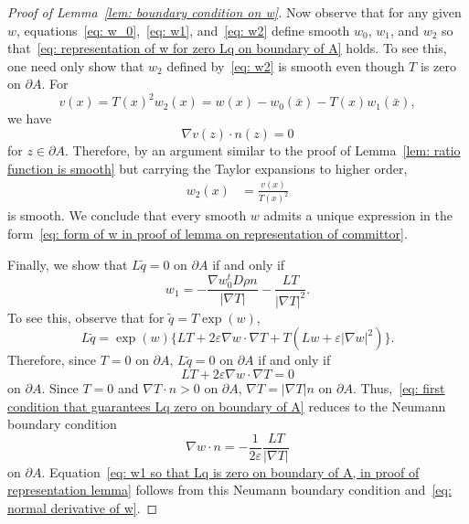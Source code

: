 \documentclass[reqno]{amsart}
\newcommand{\eps}{\varepsilon}
\newcommand{\1}{\mathds{1}}
\newcommand{\grad}{\nabla}
\theoremstyle{definition}
\theoremstyle{remark}
\begin{document}
\begin{proof}[Proof of Lemma~\ref{lem: boundary condition on w}]
  Now observe that for any given $w$, equations~\eqref{eq: w_0},~\eqref{eq: w1}, and~\eqref{eq: w2} define smooth $w_0$, $w_1$, and $w_2$ so that~\eqref{eq: representation of w for zero Lq on boundary of A} holds. To see this, one need only show that $w_2$ defined by~\eqref{eq: w2} is smooth even though $T$ is zero on $\partial A$. For
  \begin{equation*}
    v(x) = T(x)^2 w_2(x) = w(x) - w_0 (\bar x) - T(x) w_1(\bar x),
  \end{equation*}
  we have 
  \begin{equation*}
    \grad v(z) \cdot n(z) = 0
  \end{equation*}
  for $z \in \partial A$. Therefore, by an argument similar to the proof of Lemma~\ref{lem: ratio function is smooth} but carrying the Taylor expansions to higher order, 
  \begin{align*}
    w_2(x) &= \frac{v(x)}{T(x)^2} 
  \end{align*}
  is smooth. We conclude that every smooth $w$ admits a unique expression in the form~\eqref{eq: form of w in proof of lemma on representation of committor}.

  Finally, we show that $L\tilde q = 0$ on $\partial A$ if and only if 
  \begin{equation}\label{eq: w1 so that Lq is zero on boundary of A, in proof of representation lemma}
    w_1 = - \frac{\grad w_0^t D \rho n}{\lvert \grad T \rvert} - \frac{LT}{\lvert \grad T \rvert^2}.
  \end{equation}
  To see this, observe that for $\tilde q = T \exp(w)$, 
  \begin{equation*}
    L \tilde q = \exp(w) \Big \{ L T + 2\eps \grad w \cdot \grad T + T (L w + \eps \lvert \grad w \rvert^2 ) \Big \}.
  \end{equation*}
  Therefore, since $T=0$ on $\partial A$, $L \tilde q =0$ on $\partial A$ if and only if
  \begin{equation}\label{eq: first condition that guarantees Lq zero on boundary of A} 
    L T + 2\eps \grad w \cdot \grad T = 0 
  \end{equation}
  on $\partial A$. Since $T =0$ and $\grad T \cdot n >0$ on $\partial A$, $\grad T = \lvert \grad T \rvert n$ on $\partial A$. Thus,~\eqref{eq: first condition that guarantees Lq zero on boundary of A} reduces to the Neumann boundary condition
  \begin{equation}\label{eq: Neumann bc for w}
    \grad w \cdot n = -\frac{1}{2 \eps} \frac{L T}{\lvert \grad T \rvert}
  \end{equation}
  on $\partial A$. Equation~\eqref{eq: w1 so that Lq is zero on boundary of A, in proof of representation lemma} follows from  this Neumann boundary condition and~\eqref{eq: normal derivative of w}. 
\end{proof}



\end{document}
